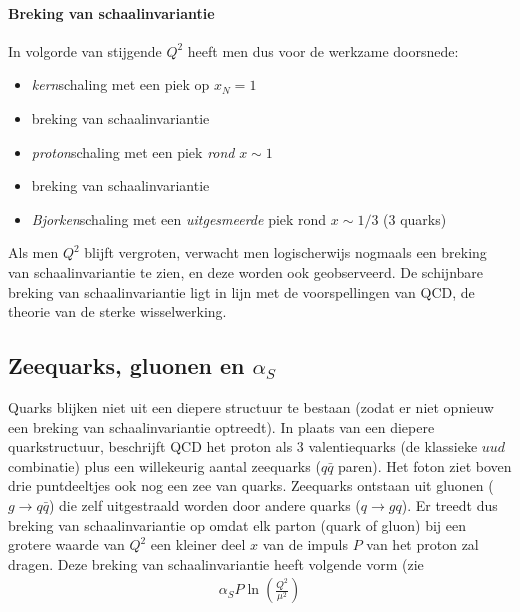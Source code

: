 \documentclass[a4paper,11pt]{article}
\numberwithin{equation}{section} %
\begin{document}
      \paragraph{Breking van schaalinvariantie}
In volgorde van stijgende $Q^2$ heeft men dus voor de werkzame doorsnede:
\begin{itemize}
  \item\textit{kern}schaling met een piek op $x_N=1$
  \item  breking van schaalinvariantie
  \item \textit{proton}schaling met een piek \textit{rond} $x \sim 1$
  \item breking van schaalinvariantie
  \item \textit{Bjorken}schaling met een \textit{uitgesmeerde} piek rond $x \sim 1/3$ (3 quarks)
\end{itemize}
Als men $Q^2$ blijft vergroten, verwacht men logischerwijs nogmaals een breking van schaalinvariantie te zien, en deze worden ook geobserveerd.
De schijnbare breking van schaalinvariantie ligt in lijn met de voorspellingen van QCD, de theorie van de sterke wisselwerking.

  \subsection{Zeequarks, gluonen en $\alpha_S$}
Quarks blijken niet uit een diepere structuur te bestaan (zodat er niet opnieuw een breking van schaalinvariantie optreedt).
In plaats van een diepere quarkstructuur, beschrijft QCD het proton als 3 valentiequarks (de klassieke $u u d$ combinatie) plus een willekeurig aantal zeequarks ($q\bar{q}$ paren).
Het foton ziet boven drie puntdeeltjes ook nog een zee van quarks.
Zeequarks ontstaan uit gluonen ($g\rightarrow q\bar{q}$) die zelf uitgestraald worden door andere quarks ($q\rightarrow gq$).
Er treedt dus breking van schaalinvariantie op omdat elk parton (quark of gluon) bij een grotere waarde van $Q^2$ een kleiner deel  $x$ van de impuls $P$ van het proton zal dragen.
Deze breking van schaalinvariantie heeft volgende vorm (zie %
\begin{align}
\alpha_S P \ln{\left( \frac{Q^2}{\mu^2}\right)}
\end{align}
\end{document}
